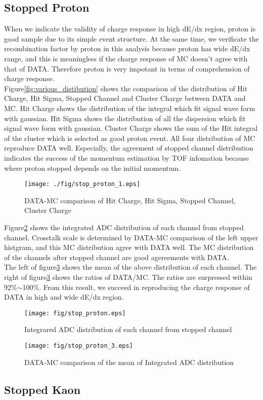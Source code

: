 \subsection{Stopped Proton}

When we indicate the validity of charge response in high dE/dx region, proton is good sample due to its simple event structure.
At the same time, we verificate the recombination factor by proton in this analysis because proton has wide dE/dx range, and this is meaningless if the charge response of MC doesn't agree with that of DATA.
Therefore proton is very impotant in terms of comprehension of charge response.\\
Figure\ref{fig:various_distibution} shows the comparison of the distribution of Hit Charge, Hit Sigma, Stopped Channel and  Cluster Charge between DATA and MC.
Hit Charge shows the distribution of the integral which fit signal wave form  with gaussian.
Hit Sigma shows the distribution of all the dispersion which fit signal wave form with gaussian.
Cluster Charge shows the sum of the Hit integral of the cluster which is selected as good proton event.
All four distribution of MC reproduce DATA well.
Especially, the agreement of stopped channel distribution indicates the success of the momentum estimation by TOF infomation because where proton stopped depends on the initial momentum.\\

\begin{figure}[htbp]
  \centering
  \texttt{[image: ./fig/stop\_proton\_1.eps]}
  \caption{DATA-MC comparison of Hit Charge, Hit Sigma, Stopped Channel, Cluster Charge}
  \label{fig:varios_distribution}
\end{figure}

Figure\ref{fig:ADC_distribution} shows the integrated ADC distribution of each channel from stopped channel.
Crosstalk scale is determined by DATA-MC comparison of the left upper histgram,
and this MC distribution agree with DATA well.
The MC distribution of the channels after stopped channel are good agereements with DATA.\\
The left of figure\ref{fig:Mean_comparison} shows the mean of the above distribution of each channel.
The right of figure\ref{fig:Mean_comparison} shows the ratios of DATA/MC.
The ratios are surpressed within 92\%$\sim$100\%.
From this result, we succeed in reproducing the charge response of DATA in high and wide dE/dx region.

\begin{figure}[htbp]
  \centering
  \texttt{[image: fig/stop\_proton.eps]}
  \caption{Integrared ADC distribution of each channel from stopped channel}
  \label{fig:ADC_distribution}
\end{figure}

\begin{figure}[htbp]
  \centering
  \texttt{[image: fig/stop\_proton\_3.eps]}
  \caption{DATA-MC comparison of the mean of Integrated ADC distribution}
  \label{fig:Mean_comparison}
\end{figure}

\subsection{Stopped Kaon}

